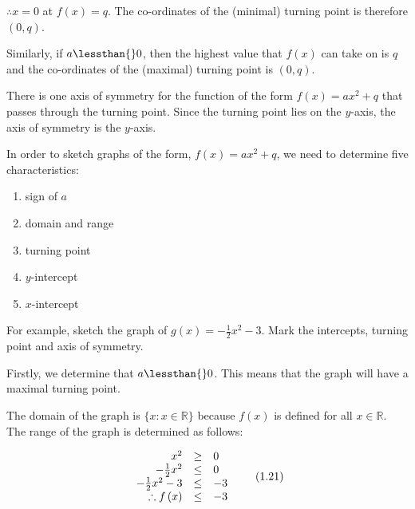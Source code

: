 \label{m39345*id244283}$\therefore $$x=0$ at $f\left(x\right)=q$. The co-ordinates of the (minimal) turning point is therefore $\left(0,q\right)$.\par 
\label{m39345*id244351}Similarly, if $a\lessthan{}0$, then the highest value that $f\left(x\right)$ can take on is $q$ and the co-ordinates of the (maximal) turning point is $\left(0,q\right)$.\par 
\label{m39345*uid122}
\nopagebreak
\label{m39345*id244424}There is one axis of symmetry for the function of the form $f\left(x\right)=a{x}^{2}+q$ that passes through the turning point. Since the turning point lies on the $y$-axis, the axis of symmetry is the $y$-axis.\par 
\label{m39345*uid123}
\nopagebreak
\label{m39345*id244525}In order to sketch graphs of the form, $f\left(x\right)=a{x}^{2}+q$, we need to determine five characteristics:\par 
\label{m39345*id244564}\begin{enumerate}[noitemsep, label=\textbf{\arabic*}. ] 
\label{m39345*uid124}\item sign of $a$\label{m39345*uid125}\item domain and range
\label{m39345*uid126}\item turning point
\label{m39345*uid127}\item $y$-intercept
\label{m39345*uid128}\item $x$-intercept
\end{enumerate}
\label{m39345*id244652}For example, sketch the graph of $g\left(x\right)=-\frac{1}{2}{x}^{2}-3$. Mark the intercepts, turning point and axis of symmetry.\par 
\label{m39345*id244698}Firstly, we determine that $a\lessthan{}0$. This means that the graph will have a maximal turning point.\par 
\label{m39345*id244718}The domain of the graph is $\{x:x\in \mathbb{R}\}$ because $f\left(x\right)$ is defined for all $x\in \mathbb{R}$. The range of the graph is determined as follows:\par 
\label{m39345*id244783}\nopagebreak\noindent{}
\begin{equation}
\begin{array}{ccc}\hfill {x}^{2}& \ge & 0\hfill \\ \hfill -\frac{1}{2}{x}^{2}& \le & 0\hfill \\ \hfill -\frac{1}{2}{x}^{2}-3& \le & -3\hfill \\ \hfill \therefore f\left(x\right)& \le & -3\hfill \end{array}\tag{1.21}

\end{equation}$$
